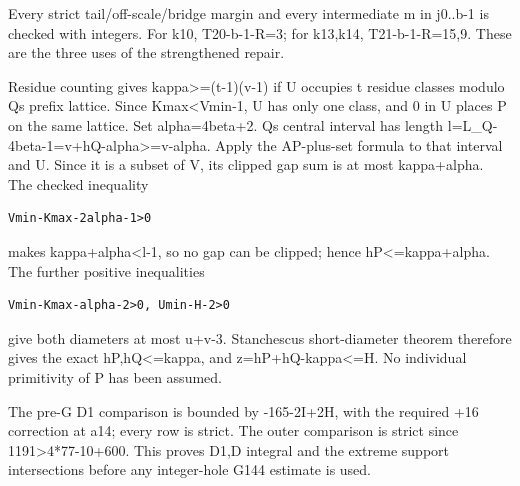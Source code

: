 \documentclass[10pt,a4paper]{article}
\theoremstyle{definition}
\begin{document}
Every strict tail/off-scale/bridge margin and every intermediate m in
j0..b-1 is checked with integers. For k10,\allowbreak{} T20-b-1-R=\allowbreak{}3; for k13,\allowbreak{}k14,\allowbreak{}
T21-b-1-R=\allowbreak{}15,\allowbreak{}9. These are the three uses of the strengthened repair.

Residue counting gives kappa\textgreater=\allowbreak{}(t-1)(v-1) if U occupies t
residue classes modulo Q\textquotesingle s prefix lattice. Since
Kmax\textless Vmin-1,\allowbreak{} U has only one class,\allowbreak{} and 0 in U places P on the
same lattice. Set alpha=\allowbreak{}4beta+\allowbreak{}2. Q\textquotesingle s central interval
has length l=\allowbreak{}L\_\allowbreak{}Q-4beta-1=\allowbreak{}v+\allowbreak{}hQ-alpha\textgreater=\allowbreak{}v-alpha. Apply the
AP-plus-set formula to that interval and U. Since it is a subset of V,\allowbreak{}
its clipped gap sum is at most kappa+\allowbreak{}alpha. The checked inequality

\begin{lstlisting}
Vmin-Kmax-2alpha-1>0
\end{lstlisting}

makes kappa+\allowbreak{}alpha\textless l-1,\allowbreak{} so no gap can be clipped; hence
hP\textless=\allowbreak{}kappa+\allowbreak{}alpha. The further positive inequalities

\begin{lstlisting}
Vmin-Kmax-alpha-2>0, Umin-H-2>0
\end{lstlisting}

give both diameters at most u+\allowbreak{}v-3. Stanchescu\textquotesingle s
short-diameter theorem therefore gives the exact hP,\allowbreak{}hQ\textless=\allowbreak{}kappa,\allowbreak{}
and z=\allowbreak{}hP+\allowbreak{}hQ-kappa\textless=\allowbreak{}H. No individual primitivity of P has been
assumed.

The pre-G D1 comparison is bounded by -165-2I+\allowbreak{}2H,\allowbreak{} with the required +\allowbreak{}16
correction at a14; every row is strict. The outer comparison is strict
since 1191\textgreater4*77-10+\allowbreak{}600. This proves D1,\allowbreak{}D integral and the
extreme support intersections before any integer-hole G144 estimate is
used.
\end{document}
